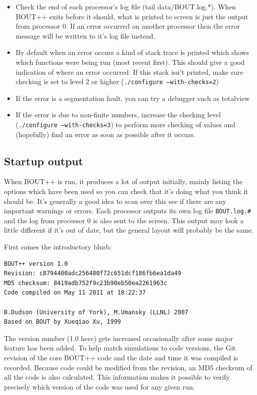 \documentclass[12pt]{article}
\newcommand{\code}[1]{\texttt{#1}}
\begin{document}
%
\begin{itemize}
\item Check the end of each processor's log file (tail data/BOUT.log.*). When
    BOUT++ exits before it should, what is printed to screen is just the output
    from processor 0.  If an error occurred on another processor then the error
    message will be written to it's log file instead.
\item By default when an error occurs a kind of stack trace is printed which shows which functions
were being run (most recent first). This should give a good indication of where
an error occurred.  If this stack isn't printed, make sure checking is set to
level 2 or higher (\code{./configure --with-checks=2})
\item If the error is a segmentation fault, you can try a debugger such as totalview
\item If the error is due to non-finite numbers, increase the checking level
    (\code{./configure --with-checks=3}) to perform more checking of values and
    (hopefully) find an error as soon as possible after it occurs.
\end{itemize}
%



\subsection{Startup output}
%
When BOUT++ is run, it produces a lot of output initially, mainly listing the
options which have been used so you can check that it's doing what you think it
should be. It's generally a good idea to scan over this see if there are any
important warnings or errors. Each processor outputs its own log file
\texttt{BOUT.log.\#} and the log from processor 0 is also sent to the screen.
This output may look a little different if it's out of date, but the general
layout will probably be the same.

First comes the introductory blurb:
%
\begin{verbatim}
BOUT++ version 1.0
Revision: c8794400adc256480f72c651dcf186fb6ea1da49
MD5 checksum: 8419adb752f9c23b90eb50ea2261963c
Code compiled on May 11 2011 at 18:22:37

B.Dudson (University of York), M.Umansky (LLNL) 2007
Based on BOUT by Xueqiao Xu, 1999
\end{verbatim}
%
The version number (1.0 here) gets increased occasionally after some major
feature has been added. To help match simulations to code versions, the Git
revision of the core BOUT++ code and the date and time it was compiled is
recorded. Because code could be modified from the revision, an MD5 checksum of
all the code is also calculated. This information makes it possible to verify
precisely which version of the code was used for any given run.
\end{document}
